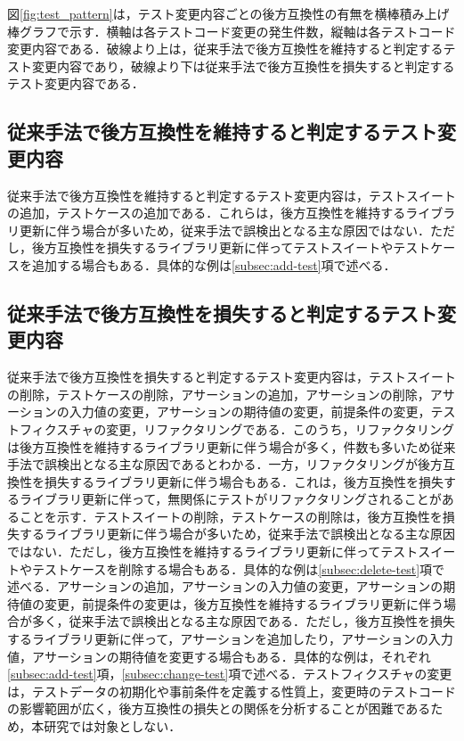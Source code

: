 \documentclass[11pt,dvipdfmx]{jreport}
\begin{document}
図\ref{fig:test_pattern}は，テスト変更内容ごとの後方互換性の有無を横棒積み上げ棒グラフで示す．横軸は各テストコード変更の発生件数，縦軸は各テストコード変更内容である．破線より上は，従来手法で後方互換性を維持すると判定するテスト変更内容であり，破線より下は従来手法で後方互換性を損失すると判定するテスト変更内容である．

\subsection{従来手法で後方互換性を維持すると判定するテスト変更内容}
従来手法で後方互換性を維持すると判定するテスト変更内容は，テストスイートの追加，テストケースの追加である．これらは，後方互換性を維持するライブラリ更新に伴う場合が多いため，従来手法で誤検出となる主な原因ではない．ただし，後方互換性を損失するライブラリ更新に伴ってテストスイートやテストケースを追加する場合もある．具体的な例は\ref{subsec:add-test}項で述べる．

\subsection{従来手法で後方互換性を損失すると判定するテスト変更内容}
従来手法で後方互換性を損失すると判定するテスト変更内容は，テストスイートの削除，テストケースの削除，アサーションの追加，アサーションの削除，アサーションの入力値の変更，アサーションの期待値の変更，前提条件の変更，テストフィクスチャの変更，リファクタリングである．このうち，リファクタリングは後方互換性を維持するライブラリ更新に伴う場合が多く，件数も多いため従来手法で誤検出となる主な原因であるとわかる．一方，リファクタリングが後方互換性を損失するライブラリ更新に伴う場合もある．これは，後方互換性を損失するライブラリ更新に伴って，無関係にテストがリファクタリングされることがあることを示す．テストスイートの削除，テストケースの削除は，後方互換性を損失するライブラリ更新に伴う場合が多いため，従来手法で誤検出となる主な原因ではない．ただし，後方互換性を維持するライブラリ更新に伴ってテストスイートやテストケースを削除する場合もある．具体的な例は\ref{subsec:delete-test}項で述べる．アサーションの追加，アサーションの入力値の変更，アサーションの期待値の変更，前提条件の変更は，後方互換性を維持するライブラリ更新に伴う場合が多く，従来手法で誤検出となる主な原因である．ただし，後方互換性を損失するライブラリ更新に伴って，アサーションを追加したり，アサーションの入力値，アサーションの期待値を変更する場合もある．具体的な例は，それぞれ\ref{subsec:add-test}項，\ref{subsec:change-test}項で述べる．テストフィクスチャの変更は，テストデータの初期化や事前条件を定義する性質上，変更時のテストコードの影響範囲が広く，後方互換性の損失との関係を分析することが困難であるため，本研究では対象としない．
\end{document}
